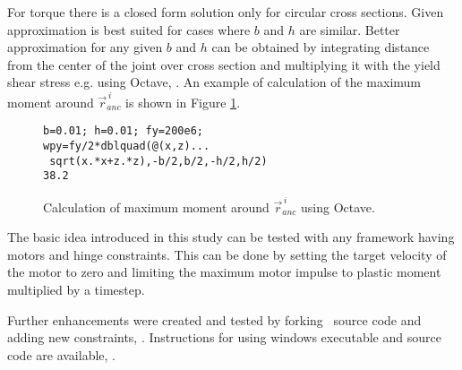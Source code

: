 For torque there is a closed form solution only for
circular cross sections.
Given approximation is 
best suited for cases where $b$ and $h$ are similar.
Better approximation for any given $b$ and $h$ can be obtained 
by integrating distance from the center of the joint over cross section and
multiplying it with the yield shear stress e.g. using Octave, \cite{octave}.
An example of calculation of the maximum moment  around $\vec{r}_{anc}^{\,i} $
is shown in Figure \ref{fig:octave-mp}.

\begin{figure}
\centering
\lstset{language=octave}
\begin{lstlisting}
b=0.01; h=0.01; fy=200e6;
wpy=fy/2*dblquad(@(x,z)...
 sqrt(x.*x+z.*z),-b/2,b/2,-h/2,h/2)
38.2
\end{lstlisting}

\caption{Calculation of maximum moment  around $\vec{r}_{anc}^{\,i} $ using Octave.}
\label{fig:octave-mp}
\end{figure}


The basic idea introduced in this study can be tested with any framework having motors and hinge constraints.
This can be done by setting the target velocity of the motor to zero and limiting 
the maximum motor impulse to plastic moment multiplied by a timestep.

Further enhancements were created and tested by forking \cbullet\ source code
and adding new constraints, \cite{pbullet}.
Instructions for using  windows executable and  source code are available, \cite{bp}.

